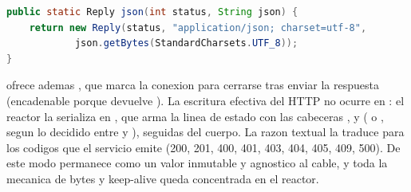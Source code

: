 \begin{lstlisting}[language=Java,caption={Factoria JSON de respuestas (net/Reply.java)}]
public static Reply json(int status, String json) {
    return new Reply(status, "application/json; charset=utf-8",
            json.getBytes(StandardCharsets.UTF_8));
}
\end{lstlisting}

 ofrece ademas , que marca la conexion para cerrarse tras
enviar la respuesta (encadenable porque devuelve ). La escritura efectiva
del HTTP no ocurre en : el reactor la serializa en ,
que arma la linea de estado  con las cabeceras
,  y  (
o , segun lo decidido entre  y
), seguidas del cuerpo. La razon textual la traduce
 para los codigos que el servicio emite (200, 201, 400, 401, 403,
404, 405, 409, 500). De este modo  permanece como un valor inmutable y
agnostico al cable, y toda la mecanica de bytes y keep-alive queda concentrada en el
reactor.
